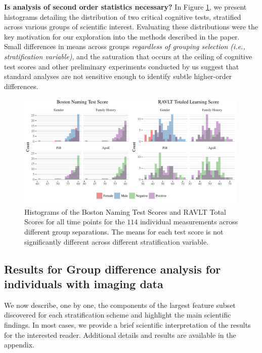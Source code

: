 {\bf Is analysis of second order statistics necessary?} In Figure \ref{fig:imagehists}, we present histograms detailing the distribution of two critical cognitive tests, stratified across various groups of scientific interest. Evaluating these distributions were the key motivation for our exploration into the methods described in the paper. Small differences in means across groups {\em regardless of grouping selection (i.e., stratification variable)}, and the saturation that occurs at the ceiling of cognitive test scores and other preliminary experiments conducted by us suggest that standard analyses are not sensitive enough to identify subtle higher-order differences.
\begin{figure}[]
	\centering
	\includegraphics[width=0.99\textwidth]{3_covtraj/figs/hists.pdf}
	\caption[Summary histograms of neuropsychological test scores for preclinical AD participants]{Histograms of the Boston Naming Test Scores and RAVLT Total Scores for all time points for the $114$ individual measurements across different group separations. The means for each test score is not significantly different across different stratification variable.}
	\label{fig:imagehists}
\end{figure}
\subsection{Results for Group difference analysis for individuals with imaging data}
We now describe, one by one, the components of the largest feature subset discovered for each stratification scheme 
and highlight the main scientific findings. In most cases, we provide a brief scientific interpretation of the results
for the interested reader. 
Additional details and results are available in the appendix.
%


